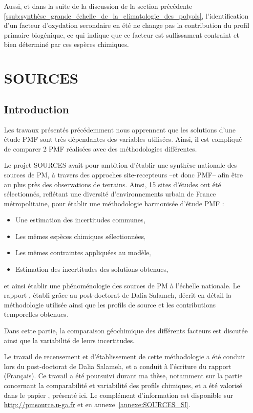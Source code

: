 Aussi, et dans la suite de la discussion de la section précédente
\ref{ssub:synthèse_grande_échelle_de_la_climatologie_des_polyols}, l'identification d'un
facteur d'oxydation secondaire en été ne change pas la contribution du profil primaire
biogénique, ce qui indique que ce facteur est suffissament contraint et bien déterminé
par ces espèces chimiques.

\clearpage

\section{SOURCES}%
\label{sec:sources}

\subsection{Introduction}

Les travaux présentés précédemment nous apprennent que les solutions d'une étude PMF sont
très dépendantes des variables utilisées. Ainsi, il est compliqué de comparer 2 PMF
réalisées avec des méthodologies différentes.

Le projet SOURCES avait pour ambition d'établir une synthèse nationale des
sources de PM, à travers des approches site-recepteurs --et donc PMF-- afin être au plus
près des observations de terrains.
Ainsi, 15 sites d'études ont été sélectionnés, reflétant une diversité d'environnements
urbain de France métropolitaine, pour établir une méthodologie harmonisée d'étude PMF :
\begin{itemize}
    \item Une estimation des incertitudes communes,
    \item Les mêmes espèces chimiques sélectionnées,
    \item Les mêmes contraintes appliquées au modèle,
    \item Estimation des incertitudes des solutions obtenues,
\end{itemize}
et ainsi établir une phénoménologie des sources de PM à l'échelle nationale.
Le rapport \cite{favezTraitement2017}, établi grâce au post-doctorat de Dalia Salameh,
décrit en détail la méthodologie utilisée ainsi que les profils de source et les
contributions temporelles obtenues.

Dans cette partie, la comparaison géochimique des différents facteurs est discutée ainsi
que la variabilité de leurs incertitudes.

\begin{tcolorbox}[colback=red!5!white,colframe=Melon,title=Note]
    Le travail de recensement et d'établissement de cette méthodologie a été conduit lors
    du post-doctorat de Dalia Salameh, et a conduit à l'écriture du rapport 
    \cite{favezTraitement2017} (Français). Ce travail a été poursuivi durant ma thèse,
    notamment sur la partie concernant la comparabilité et variabilité des profils
    chimiques, et a été valorisé dans le papier \cite{weberComparison2019}, présenté ici.
    Le complément d'information est disponible sur \url{http://pmsource.u-ga.fr} et en
    annexe~\ref{annexe:SOURCES_SI}.
\end{tcolorbox}

